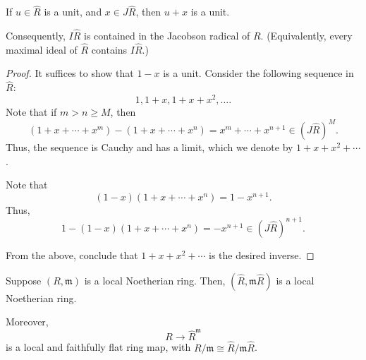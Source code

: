 \documentclass[12pt]{article}
\begin{document}
\begin{cor}
	If $u \in \widehat{R}$ is a unit, and $x \in J \widehat{R}$, then $u + x$ is a unit.

	Consequently, $I \widehat{R}$ is contained in the Jacobson radical of $R$. (Equivalently, every maximal ideal of $\widehat{R}$ contains $I \widehat{R}$.)
\end{cor}
\begin{proof} 
	It suffices to show that $1 - x$ is a unit. Consider the following sequence in $\widehat{R}$:
	\begin{equation*} 
		1, 1 + x, 1 + x + x^{2}, \ldots.
	\end{equation*}
	Note that if $m > n \ge M$, then
	\begin{equation*} 
		(1 + x + \cdots + x^{m}) - (1 + x + \cdots + x^{n}) = x^{m} + \cdots + x^{n + 1} \in (J \widehat{R})^{M}.
	\end{equation*}
	Thus, the sequence is Cauchy and has a limit, which we denote by $1 + x + x^{2} + \cdots$.

	Note that
	\begin{equation*} 
		(1 - x)(1 + x + \cdots + x^{n}) = 1 - x^{n + 1}.
	\end{equation*}
	Thus,
	\begin{equation*} 
		1 - (1 - x)(1 + x + \cdots + x^{n}) = -x^{n + 1} \in (J \widehat{R})^{n + 1}.
	\end{equation*}

	From the above, conclude that $1 + x + x^{2} + \cdots$ is the desired inverse.
\end{proof}

\begin{cor}
	Suppose $(R, \mathfrak{m})$ is a local Noetherian ring. Then, $(\widehat{R}, \mathfrak{m} \widehat{R})$ is a local Noetherian ring.

	Moreover,
	\begin{equation*} 
		R \to \widehat{R}^{\mathfrak{m}}
	\end{equation*}
	is a local and faithfully flat ring map, with $R/\mathfrak{m} \cong \widehat{R}/\mathfrak{m}\widehat{R}$.
\end{cor}
\end{document}
